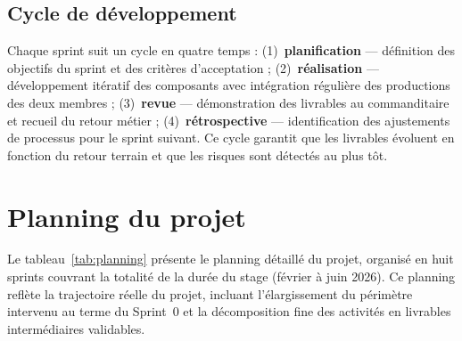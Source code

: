 \documentclass[../main.tex]{subfiles}
\begin{document}
\subsection{Cycle de développement}

Chaque sprint suit un cycle en quatre temps : (1)~\textbf{planification} --- définition des objectifs du sprint et des critères d'acceptation ; (2)~\textbf{réalisation} --- développement itératif des composants avec intégration régulière des productions des deux membres ; (3)~\textbf{revue} --- démonstration des livrables au commanditaire et recueil du retour métier ; (4)~\textbf{rétrospective} --- identification des ajustements de processus pour le sprint suivant. Ce cycle garantit que les livrables évoluent en fonction du retour terrain et que les risques sont détectés au plus tôt.

\clearpage
\section{Planning du projet}

Le tableau~\ref{tab:planning} présente le planning détaillé du projet, organisé en huit sprints couvrant la totalité de la durée du stage (février à juin 2026). Ce planning reflète la trajectoire réelle du projet, incluant l'élargissement du périmètre intervenu au terme du Sprint~0 et la décomposition fine des activités en livrables intermédiaires validables.
\end{document}
